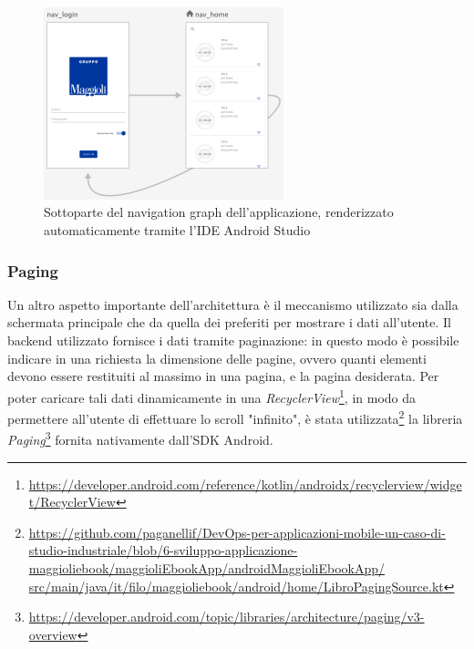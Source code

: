 \begin{figure}[H]
    \centering
    \includegraphics[width=0.62\textwidth]{img/android-nav-graph.png}
    \caption{Sottoparte del navigation graph dell'applicazione, renderizzato automaticamente tramite l'IDE Android Studio}
    \label{android-nav-graph-png}
\end{figure}

\subsubsection*{Paging}
\label{pagingsec}
Un altro aspetto importante dell'architettura è il meccanismo utilizzato sia dalla schermata principale che da quella dei preferiti per mostrare i dati all'utente.
Il backend utilizzato fornisce i dati tramite paginazione: 
in questo modo è possibile indicare in una richiesta la dimensione delle pagine, 
ovvero quanti elementi devono essere restituiti al massimo in una pagina, 
e la pagina desiderata. 
Per poter caricare tali dati dinamicamente in una \textit{RecyclerView}\footnote{\href{https://developer.android.com/reference/kotlin/androidx/recyclerview/widget/RecyclerView}{https://developer.android.com/reference/kotlin/androidx/recyclerview/widget/RecyclerView}}, in modo da permettere all'utente di effettuare lo scroll "infinito", è stata utilizzata\footnote{\href{https://github.com/paganellif/DevOps-per-applicazioni-mobile-un-caso-di-studio-industriale/blob/6-sviluppo-applicazione-maggioliebook/maggioliEbookApp/androidMaggioliEbookApp/src/main/java/it/filo/maggioliebook/android/home/LibroPagingSource.kt}{https://github.com/paganellif/DevOps-per-applicazioni-mobile-un-caso-di-studio-industriale/blob/6-sviluppo-applicazione-maggioliebook/maggioliEbookApp/androidMaggioliEbookApp/\\src/main/java/it/filo/maggioliebook/android/home/LibroPagingSource.kt}} la libreria \textit{Paging}\footnote{\href{https://developer.android.com/topic/libraries/architecture/paging/v3-overview}{https://developer.android.com/topic/libraries/architecture/paging/v3-overview}} fornita nativamente dall'SDK Android.

